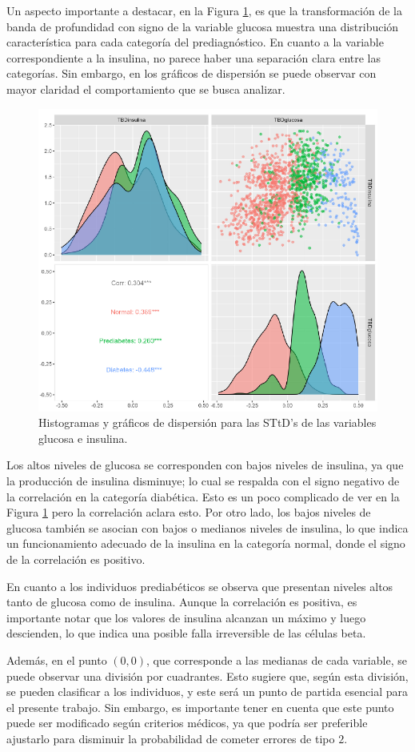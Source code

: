 Un aspecto importante a destacar, en la Figura \ref{fig:pairsTBD}, es que la transformación de la banda de profundidad con signo de la variable glucosa muestra una distribución característica para cada categoría del prediagnóstico. En cuanto a la variable correspondiente a la insulina, no parece haber una separación clara entre las categorías. Sin embargo, en los gráficos de dispersión se puede observar con mayor claridad el comportamiento que se busca analizar.

\begin{figure}[H]
    \centering
    \includegraphics[width = 0.7 \textwidth]{Imagenes/pairsTBDS.png}
    \caption{Histogramas y gráficos de dispersión para las STtD's de las variables glucosa e insulina.}
    \label{fig:pairsTBD}
\end{figure}


Los altos niveles de glucosa se corresponden con bajos niveles de insulina, ya que la producción de insulina disminuye; lo cual se respalda con el signo negativo de la correlación en la categoría diabética. Esto es un poco complicado de ver en la Figura \ref{fig:pairsTBD} pero la correlación aclara esto. Por otro lado, los bajos niveles de glucosa también se asocian con bajos o medianos niveles de insulina, lo que indica un funcionamiento adecuado de la insulina en la categoría normal, donde el signo de la correlación es positivo.

En cuanto a los individuos prediabéticos se observa que presentan niveles altos tanto de glucosa como de insulina. Aunque la correlación es positiva, es importante notar que los valores de insulina alcanzan un máximo y luego descienden, lo que indica una posible falla irreversible de las células beta.

Además, en el punto $(0, 0)$, que corresponde a las medianas de cada variable, se puede observar una división por cuadrantes. Esto sugiere que, según esta división, se pueden clasificar a los individuos, y este será un punto de partida esencial para el presente trabajo. Sin embargo, es importante tener en cuenta que este punto puede ser modificado según criterios médicos, ya que podría ser preferible ajustarlo para disminuir la probabilidad de cometer errores de tipo $2$.

